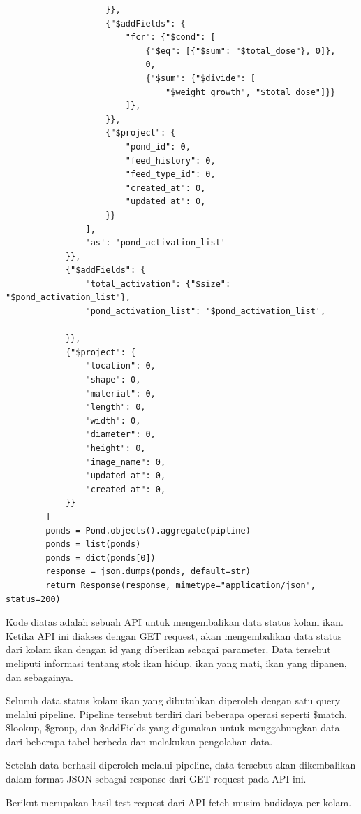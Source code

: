 \begin{enumerate}[1.]
\begin{lstlisting}
                    }},
                    {"$addFields": {
                        "fcr": {"$cond": [
                            {"$eq": [{"$sum": "$total_dose"}, 0]},
                            0,
                            {"$sum": {"$divide": [
                                "$weight_growth", "$total_dose"]}}
                        ]},
                    }},
                    {"$project": {
                        "pond_id": 0,
                        "feed_history": 0,
                        "feed_type_id": 0,
                        "created_at": 0,
                        "updated_at": 0,
                    }}
                ],
                'as': 'pond_activation_list'
            }},
            {"$addFields": {
                "total_activation": {"$size": "$pond_activation_list"},
                "pond_activation_list": '$pond_activation_list',

            }},
            {"$project": {
                "location": 0,
                "shape": 0,
                "material": 0,
                "length": 0,
                "width": 0,
                "diameter": 0,
                "height": 0,
                "image_name": 0,
                "updated_at": 0,
                "created_at": 0,
            }}
        ]
        ponds = Pond.objects().aggregate(pipline)
        ponds = list(ponds)
        ponds = dict(ponds[0])
        response = json.dumps(ponds, default=str)
        return Response(response, mimetype="application/json", status=200)
\end{lstlisting}

Kode diatas adalah sebuah API untuk mengembalikan data status kolam ikan. Ketika API ini diakses dengan GET request, akan mengembalikan data status dari kolam ikan dengan id yang diberikan sebagai parameter. Data tersebut meliputi informasi tentang stok ikan hidup, ikan yang mati, ikan yang dipanen, dan sebagainya.

Seluruh data status kolam ikan yang dibutuhkan diperoleh dengan satu query melalui pipeline. Pipeline tersebut terdiri dari beberapa operasi seperti \$match, \$lookup, \$group, dan \$addFields yang digunakan untuk menggabungkan data dari beberapa tabel berbeda dan melakukan pengolahan data.

Setelah data berhasil diperoleh melalui pipeline, data tersebut akan dikembalikan dalam format JSON sebagai response dari GET request pada API ini.

Berikut merupakan hasil test request dari API fetch musim budidaya per kolam.


\end{enumerate}
